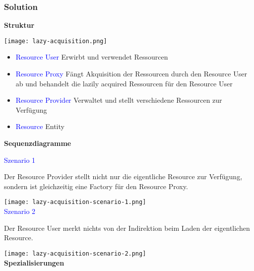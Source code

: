 \subsubsection{Solution}

\textbf{Struktur}

\texttt{[image: lazy-acquisition.png]}

\begin{itemize}
    \item \textcolor{blue}{Resource User} Erwirbt und verwendet Ressourcen
    \item \textcolor{blue}{Resource Proxy} Fängt Akquisition der Ressourcen durch den Resource User ab und behandelt die lazily acquired Ressourcen für den Resource User
    \item \textcolor{blue}{Resource Provider} Verwaltet und stellt verschiedene Ressourcen zur Verfügung
    \item \textcolor{blue}{Resource} Entity
\end{itemize}

\textbf{Sequenzdiagramme}

\textcolor{blue}{Szenario 1}

Der Resource Provider stellt nicht nur die eigentliche Resource zur Verfügung, sondern ist gleichzeitig eine Factory für den Resource Proxy.

\texttt{[image: lazy-acquisition-scenario-1.png]} \\

\textcolor{blue}{Szenario 2}

Der Resource User merkt nichts von der Indirektion beim Laden der eigentlichen Resource.

\texttt{[image: lazy-acquisition-scenario-2.png]} \\

\textbf{Spezialisierungen}

